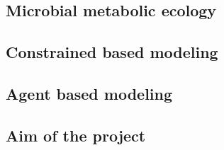\subsection{Microbial metabolic ecology}

\subsection{Constrained based modeling}

\subsection{Agent based modeling}

\subsection{Aim of the project}
